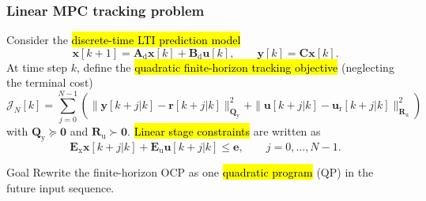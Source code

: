 \begin{frame}
	\frametitle{Linear MPC tracking problem}
	Consider the \hl{discrete-time LTI prediction model}
	\begin{equation}
		\bm{x}[k+1]=\bm{A}_{\mathrm{d}}\bm{x}[k]+\bm{B}_{\mathrm{d}}\bm{u}[k],
		\qquad
		\bm{y}[k]=\bm{C}\bm{x}[k].
	\end{equation}\pause%
	At time step $k$, define the \hl{quadratic finite-horizon tracking objective} (neglecting the terminal cost)
	\begin{equation}
		\mathcal{J}_{N}[k]
		=\sum_{j=0}^{N-1}
		\left(\|\bm{y}[k+j|k]-\bm{r}[k+j|k]\|_{\bm{Q}_{\mathrm{y}}}^{2}
		+\|\bm{u}[k+j|k]-\bm{u}_{\mathrm{r}}[k+j|k]\|_{\bm{R}_{\mathrm{u}}}^{2}\right)
	\end{equation}\pause%
	with $\bm{Q}_{\mathrm{y}}\succeq\bm{0}$ and $\bm{R}_{\mathrm{u}}\succ\bm{0}$.
	\hl{Linear stage constraints} are written as
	\begin{equation}
		\bm{E}_{\mathrm{x}}\bm{x}[k+j|k]+\bm{E}_{\mathrm{u}}\bm{u}[k+j|k]\leq \bm{e},
		\qquad
		j=0,\ldots,N-1.
	\end{equation}\vspace{-0.4cm}\pause%
	\begin{block}{Goal}
		Rewrite the finite-horizon OCP as one \hl{quadratic program} (QP) in the future input sequence.
	\end{block}
\end{frame}

